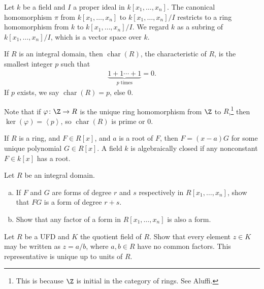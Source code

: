 \documentclass[10pt]{mypackage}
\begin{document}
Let $k$ be a field and $I$ a proper ideal in $k\left[x_1,\dots,x_n\right]$. The canonical homomorphism $\pi$ from $k\left[x_1,\dots,x_n\right]$ to $k\left[x_1,\dots,x_n\right]/I$ restricts to a ring homomorphism from $k$ to $k\left[x_1,\dots,x_n\right]/I$. We regard $k$ as a subring of $k\left[x_1,\dots,x_n\right]/I$, which is a vector space over $k$.\newline

If $R$ is an integral domain, then $\operatorname{char}\left(R\right)$, the characteristic of $R$, is the smallest integer $p$ such that 
\begin{align*}
  \underbrace{1+1\cdots +1}_{p\text{ times}} = 0. 
\end{align*}
If $p$ exists, we say $\operatorname{char}\left(R\right) = p$, else $0$.\newline

Note that if $\varphi\colon \Z\rightarrow R$ is the unique ring homomorphism from $\Z$ to $R$,\footnote{This is because $\Z$ is initial in the category of rings. See Aluffi.} then $\ker\left(\varphi\right) = \left\langle p \right\rangle$, so $\operatorname{char}\left(R\right)$ is prime or $0$.\newline

If $R$ is a ring, and $F\in R\left[x\right]$, and $a$ is a root of $F$, then $F = \left(x-a\right)G$ for some unique polynomial $G\in R[x]$. A field $k$ is algebraically closed if any nonconstant $F\in k\left[x\right]$ has a root.
\begin{exercise}[Exercise 1.1]
Let $R$ be an integral domain.
\begin{enumerate}[(a)]
  \item If $F$ and $G$ are forms of degree $r$ and $s$ respectively in $R\left[x_1,\dots,x_n\right]$, show that $FG$ is a form of degree $r+s$.
  \item Show that any factor of a form in $R\left[x_1,\dots,x_n\right]$ is also a form.
\end{enumerate}
\end{exercise}
\begin{exercise}[Exercise 1.2]
  Let $R$ be a UFD and $K$ the quotient field of $R$. Show that every element $z\in K$ may be written as $z = a/b$, where $a,b\in R$ have no common factors. This representative is unique up to units of $R$.
\end{exercise}
\begin{solution}

\end{solution}
\end{document}
